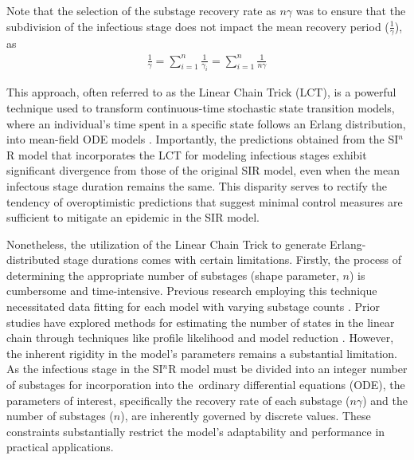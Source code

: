 \documentclass[12pt]{article}
\begin{document}
Note that the selection of the substage recovery rate as $n\gamma$ was to ensure that the subdivision of the infectious stage does not impact the mean recovery period ($\frac{1}{\gamma}$), as
\begin{align*}
    \frac{1}{\gamma} = \sum_{i=1}^{n} \frac{1}{\gamma_i} = \sum_{i=1}^{n} \frac{1}{n\gamma}
\end{align*}

This approach, often referred to as the Linear Chain Trick (LCT)\cite{MacDonald1978}, is a powerful technique used to transform continuous-time stochastic state transition models, where an individual's time spent in a specific state follows an Erlang distribution, into mean-field ODE models \cite{Kirosingh2019}. Importantly, the predictions obtained from the SI$^n$R model that incorporates the LCT for modeling infectious stages exhibit significant divergence from those of the original SIR model, even when the mean infectous stage duration remains the same. This disparity serves to rectify the tendency of overoptimistic predictions that suggest minimal control measures are sufficient to mitigate an epidemic in the SIR model\cite{Wearing2005}.
\par
Nonetheless, the utilization of the Linear Chain Trick to generate Erlang-distributed stage durations comes with certain limitations. Firstly, the process of determining the appropriate number of substages (shape parameter, $n$) is cumbersome and time-intensive. Previous research employing this technique necessitated data fitting for each model with varying substage counts \cite{Wearing2005}\cite{Hurtado2021}. Prior studies have explored methods for estimating the number of states in the linear chain through techniques like profile likelihood \cite{Raue2009} and model reduction \cite{Maiwald2016}. However, the inherent rigidity in the model's parameters remains a substantial limitation. As the infectious stage in the SI$^n$R model must be divided into an integer number of substages for incorporation into the ordinary differential equations (ODE), the parameters of interest, specifically the recovery rate of each substage ($n\gamma$) and the number of substages ($n$), are inherently governed by discrete values. These constraints substantially restrict the model's adaptability and performance in practical applications.
\par
\end{document}
